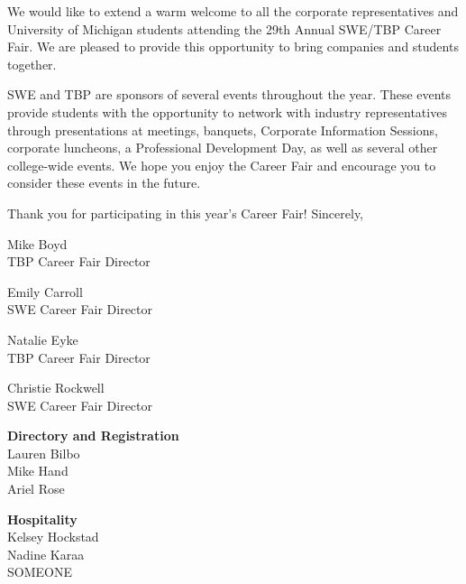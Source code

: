 \documentclass{article}
\begin{document}
We would like to extend a warm welcome to all the corporate representatives and 
University of Michigan students attending the 29th Annual SWE/TBP Career Fair. We 
are pleased to provide this opportunity to bring companies and students together. 

SWE and TBP are sponsors of several events throughout the year. These events 
provide students with the opportunity to network with industry representatives through 
presentations at meetings, banquets, Corporate Information Sessions, corporate 
luncheons, a Professional Development Day, as well as several other college-wide 
events. We hope you enjoy the Career Fair and encourage you to consider these 
events in the future. 
 
Thank you for participating in this year's Career Fair!
Sincerely, \begin{multicols}{2}
	\begin{minipage}{\columnwidth}
			Mike Boyd\\
			TBP Career Fair Director\\
			\end{minipage}
\begin{minipage}{\columnwidth}
			Emily Carroll\\
			SWE Career Fair Director\\
			\end{minipage}
\begin{minipage}{\columnwidth}
			Natalie Eyke\\
			TBP Career Fair Director\\
			\end{minipage}
\begin{minipage}{\columnwidth}
			Christie Rockwell\\
			SWE Career Fair Director\\
			\end{minipage}
\end{multicols}\begin{multicols}{2}
	\begin{minipage}{\columnwidth}
	{\bf Directory and Registration}\\
	Lauren Bilbo\\
	Mike Hand\\
	Ariel Rose\\
	
\end{minipage}
	\begin{minipage}{\columnwidth}
	{\bf Hospitality}\\
	Kelsey Hockstad\\
	Nadine Karaa\\
	SOMEONE\\
	

\end{minipage}
\end{multicols}
\end{document}
